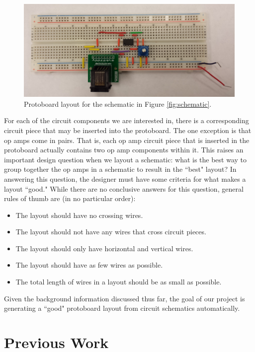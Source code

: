\begin{figure}
\begin{center}
\includegraphics[width=\textwidth]{Images/sample_physical_layout.jpg}
\caption{Protoboard layout for the schematic in Figure \ref{fig:schematic}.}
\label{fig:eg_s_to_pb}
\end{center}
\end{figure}

For each of the circuit components we are interested in, there is a corresponding
circuit piece that may be inserted into the protoboard. The one exception is that
op amps come in pairs. That is, each op amp circuit piece that is inserted in the
protoboard actually contains two op amp components within it. This raises an
important design question when we layout a schematic: what is the best way to
group together the op amps in a schematic to result in the ``best" layout? In
answering this question, the designer must have some criteria for what makes a
layout ``good." While there are no conclusive answers for this question,
general rules of thumb are (in no particular order):

\begin{itemize}
\item The layout should have no crossing wires.
\item The layout should not have any wires that cross circuit pieces.
\item The layout should only have horizontal and vertical wires.
\item The layout should have as few wires as possible.
\item The total length of wires in a layout should be as small as possible.
\end{itemize}

Given the background information discussed thus far, the goal of our project is
generating a ``good" protoboard layout from circuit schematics automatically.

\section{Previous Work}

